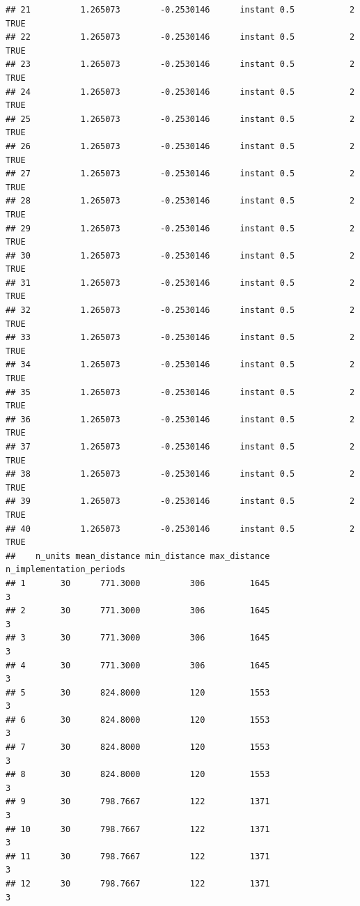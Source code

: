 \documentclass[
]{article}
\begin{document}
\begin{verbatim}
## 21          1.265073        -0.2530146      instant 0.5           2    TRUE
## 22          1.265073        -0.2530146      instant 0.5           2    TRUE
## 23          1.265073        -0.2530146      instant 0.5           2    TRUE
## 24          1.265073        -0.2530146      instant 0.5           2    TRUE
## 25          1.265073        -0.2530146      instant 0.5           2    TRUE
## 26          1.265073        -0.2530146      instant 0.5           2    TRUE
## 27          1.265073        -0.2530146      instant 0.5           2    TRUE
## 28          1.265073        -0.2530146      instant 0.5           2    TRUE
## 29          1.265073        -0.2530146      instant 0.5           2    TRUE
## 30          1.265073        -0.2530146      instant 0.5           2    TRUE
## 31          1.265073        -0.2530146      instant 0.5           2    TRUE
## 32          1.265073        -0.2530146      instant 0.5           2    TRUE
## 33          1.265073        -0.2530146      instant 0.5           2    TRUE
## 34          1.265073        -0.2530146      instant 0.5           2    TRUE
## 35          1.265073        -0.2530146      instant 0.5           2    TRUE
## 36          1.265073        -0.2530146      instant 0.5           2    TRUE
## 37          1.265073        -0.2530146      instant 0.5           2    TRUE
## 38          1.265073        -0.2530146      instant 0.5           2    TRUE
## 39          1.265073        -0.2530146      instant 0.5           2    TRUE
## 40          1.265073        -0.2530146      instant 0.5           2    TRUE
##    n_units mean_distance min_distance max_distance n_implementation_periods
## 1       30      771.3000          306         1645                        3
## 2       30      771.3000          306         1645                        3
## 3       30      771.3000          306         1645                        3
## 4       30      771.3000          306         1645                        3
## 5       30      824.8000          120         1553                        3
## 6       30      824.8000          120         1553                        3
## 7       30      824.8000          120         1553                        3
## 8       30      824.8000          120         1553                        3
## 9       30      798.7667          122         1371                        3
## 10      30      798.7667          122         1371                        3
## 11      30      798.7667          122         1371                        3
## 12      30      798.7667          122         1371                        3

\end{verbatim}
\end{document}

